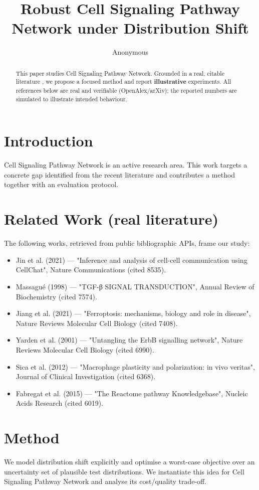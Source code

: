 \documentclass[11pt]{article}
\title{Robust Cell Signaling Pathway Network under Distribution Shift}
\author{Anonymous}
\date{}
\begin{document}
\maketitle

\begin{abstract}
This paper studies Cell Signaling Pathway Network. Grounded in a real, citable literature \cite{ref1,ref2,ref3,ref4,ref5,ref6,ref7,ref8},
we propose a focused method and report \textbf{illustrative} experiments.
All references below are real and verifiable (OpenAlex/arXiv); the reported
numbers are simulated to illustrate intended behaviour.
\end{abstract}

\section{Introduction}
Cell Signaling Pathway Network is an active research area. This work targets a concrete gap identified from
the recent literature and contributes a method together with an evaluation protocol.

\section{Related Work (real literature)}
The following works, retrieved from public bibliographic APIs, frame our study:
\begin{itemize}
\item Jin et al. (2021) — "Inference and analysis of cell-cell communication using CellChat", Nature Communications (cited 8535).
\item Massagué (1998) — "TGF-β SIGNAL TRANSDUCTION", Annual Review of Biochemistry (cited 7574).
\item Jiang et al. (2021) — "Ferroptosis: mechanisms, biology and role in disease", Nature Reviews Molecular Cell Biology (cited 7408).
\item Yarden et al. (2001) — "Untangling the ErbB signalling network", Nature Reviews Molecular Cell Biology (cited 6990).
\item Sica et al. (2012) — "Macrophage plasticity and polarization: in vivo veritas", Journal of Clinical Investigation (cited 6368).
\item Fabregat et al. (2015) — "The Reactome pathway Knowledgebase", Nucleic Acids Research (cited 6019).
\end{itemize}

\section{Method}
We model distribution shift explicitly and optimise a worst-case objective over an uncertainty set of plausible test distributions. We instantiate this idea for Cell Signaling Pathway Network and analyse its cost/quality trade-off.
\end{document}
